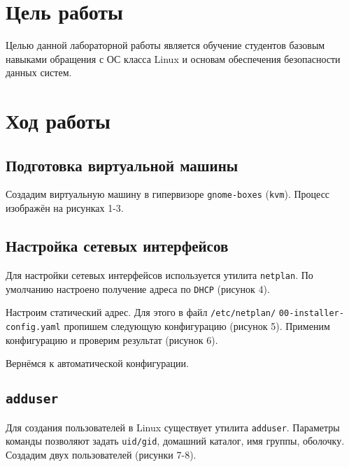 \section{Цель работы}
Целью данной лабораторной работы является обучение студентов базовым навыками обращения с ОС класса Linux и основам обеспечения безопасности данных систем.


\section{Ход работы}

\subsection{Подготовка виртуальной машины}

Создадим виртуальную машину в гипервизоре \texttt{gnome-boxes} (\texttt{kvm}). Процесс изображён на рисунках 1-3.

\FloatBarrier


\subsection{Настройка сетевых интерфейсов}

Для настройки сетевых интерфейсов используется утилита \texttt{netplan}. По умолчанию настроено получение адреса по \texttt{DHCP} (рисунок 4).

\FloatBarrier

Настроим статический адрес. Для этого в файл \texttt{/etc/netplan/} \linebreak \texttt{00-installer-config.yaml} пропишем следующую конфигурацию (рисунок 5). Применим конфигурацию и проверим результат (рисунок 6).


\FloatBarrier

Вернёмся к автоматической конфигурации.


\subsection{\texttt{adduser}}

Для создания пользователей в Linux существует утилита \texttt{adduser}. Параметры команды позволяют задать \texttt{uid/gid}, домашний каталог, имя группы, оболочку. Создадим двух пользователей (рисунки 7-8).

